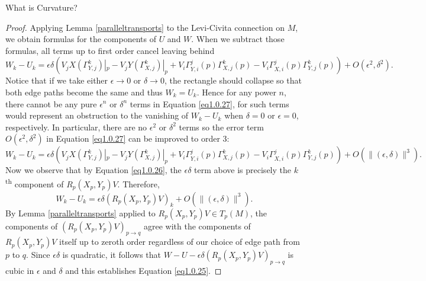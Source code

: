 \documentclass{article}
\numberwithin{equation}{subsection}
\theoremstyle{definition}
\begin{document}
\begin{section}{What is Curvature?}
\begin{proof}
Applying Lemma \ref{paralleltransports} to the Levi-Civita connection on $M$, we obtain formulas for the components of $U$ and $W$. When we subtract those formulas, all terms up to first order cancel leaving behind
\begin{equation}\label{eq1.0.27}
W_k-U_k=\epsilon\delta\left(V_jX(\Gamma_{Y,j}^k)|_p-V_jY(\Gamma_{X,j}^k)|_p+V_i\Gamma_{Y,i}^{j}(p)\Gamma_{X,j}^{k}(p)-V_i\Gamma_{X,i}^{j}(p)\Gamma_{Y,j}^{k}(p)\right)+O(\epsilon^2,\delta^2).
\end{equation}
Notice that if we take either $\epsilon\to0$ or $\delta\to0$, the rectangle should collapse so that both edge paths become the same and thus $W_k=U_k$. Hence for any power $n$, there cannot be any pure $\epsilon^n$ or $\delta^n$ terms in Equation \ref{eq1.0.27}, for such terms would represent an obstruction to the vanishing of $W_k-U_k$ when $\delta=0$ or $\epsilon=0$, respectively. In particular, there are no $\epsilon^2$ or $\delta^2$ terms so the error term $O(\epsilon^2,\delta^2)$ in Equation \ref{eq1.0.27} can be improved to order $3$:
\begin{equation}\label{eq1.0.28}
W_k-U_k=\epsilon\delta\left(V_jX(\Gamma_{Y,j}^k)|_p-V_jY(\Gamma_{X,j}^k)|_p+V_i\Gamma_{Y,i}^{j}(p)\Gamma_{X,j}^{k}(p)-V_i\Gamma_{X,i}^{j}(p)\Gamma_{Y,j}^{k}(p)\right)+O\left(\|(\epsilon,\delta)\|^3\right).
\end{equation}
Now we observe that by Equation \ref{eq1.0.26}, the $\epsilon\delta$ term above is precisely the $k$\textsuperscript{th} component of $R_p(X_p,Y_p)V$. Therefore,
\begin{equation}\label{eq1.0.29}
W_k-U_k=\epsilon\delta(R_p(X_p,Y_p)V)_k+O\left(\|(\epsilon,\delta)\|^3\right).
\end{equation}
By Lemma \ref{paralleltransports} applied to $R_p(X_p,Y_p)V\in T_p(M)$, the components of $(R_p(X_p,Y_p)V)_{p\to q}$ agree with the components of $R_p(X_p,Y_p)V$ itself up to zeroth order regardless of our choice of edge path from $p$ to $q$. Since $\epsilon\delta$ is quadratic, it follows that $W-U-\epsilon\delta(R_p(X_p,Y_p)V)_{p\to q}$ is cubic in $\epsilon$ and $\delta$ and this establishes Equation \ref{eq1.0.25}.
\end{proof}


\end{section}
\end{document}
